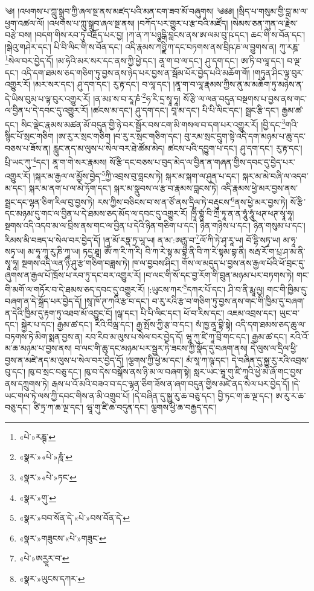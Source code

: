 ༄། །འཕགས་པ་ཀླུ་སྒྲུབ་ཀྱི་ཞལ་སྔ་ནས་མཛད་པའི་མན་ངག་ཟབ་མོ་བཞུགས། ༄༅༅། །སྲིད་པ་གསུམ་གྱི་བླ་མ་ལ་ཕྱག་འཚལ་ལོ། །འཕགས་པ་ཀླུ་སྒྲུབ་ཞལ་སྔ་ནས། །བཀོད་པར་གྱུར་པ་རྩ་བའི་མཛོད། །སེམས་ཅན་ཀུན་ལ་རྗེས་བརྩེ་བས། །བདག་གིས་རབ་ཏུ་བརྗོད་པར་བྱ། །ཀ་ན་ཀ་པཉྩདྒི་བླངས་ནས་ཨ་ལམ་བུ་ཥ་དང་། ཆང་གི་ས་བོན་དང་། །སྒེའུ་གཤེར་དང་། པི་བི་ལིང་གི་ས་བོན་དང་། འདི་རྣམས་ཀཉྫི་ཀ་དང་བཏགས་ནས་བྲིཥ་ཎ་ལ་བྱུགས་ན། ཀུ་རཎྜ་\footnote{«པེ་»རཎྚ་}སེལ་བར་བྱེད་དོ། །མ་ཧེའི་མར་སར་དང་ནས་ཀྱི་ཕྱེ་དང་། ནཱ་ག་བ་ལ་དང་། ཤུ་དག་དང་། ཨ་ཏི་བ་ལཱ་དང་། བ་ལྔ་དང་། འདི་དག་ཐམས་ཅད་གཅིག་ཏུ་བྱས་ནས་ཉེད་པར་བྱས་ན་སྦོམ་པོར་བྱེད་པའི་མཆོག་གོ། །གཏུན་ཤིང་ལྟ་བུར་འགྱུར་རོ། །མར་སར་དང་། ཤུ་དག་དང་། རུ་རྟ་དང་། བ་ལཱ་དང་། །ནཱ་ག་བ་ལཱ་རྣམས་ཀྱིས་ནུ་མ་མཆོག་ཏུ་མཉེས་ན་དེ་ཡིས་བུམ་པ་ལྟ་བུར་འགྱུར་རོ། །ན་མཿ་ས་བ་རཱ་ཎཾ་\footnote{«སྣར་»«པེ་»ཎཱཾ་}ཧ་རི་དྲ་སྭཱ་ཧཱ། སོ་རྩི་ལ་ལན་བདུན་བསྔགས་པ་བྱས་ནས་གང་ལ་བྱིན་པ་དེ་དབང་དུ་འགྱུར་རོ། །ཚངས་མ་དང་། ཤུ་དག་དང་། བཱ་མ་དང་། པི་པི་ལིང་དང་། སྦྲང་རྩི་དང་། རྒྱམ་ཚ་དང་། སིང་ལྡེང་རྣམས་མཚན་མོ་བདུན་གྱི་ཉེ་བར་སྦྱོར་བས་ངག་མི་གསལ་བ་དག་པར་འགྱུར་རོ། །བྱི་དང་\footnote{«སྣར་»«པེ་»ཏང་}གའི་སྙིང་པོ་སྲང་གཅིག །ཨ་རུ་ར་སྲང་གཅིག །བ་རུ་ར་སྲང་གཅིག་དང་། བུ་རམ་སྲང་དྲུག་སྟེ་འདི་དག་མཉམ་པ་ཆུ་དང་བཅས་པ་ཟོས་ན། རླུང་ནད་མ་ལུས་པ་སེལ་བར་ཐེ་ཚོམ་མེད། ཚངས་པའི་དབྱུག་པ་དང་། ཤུ་དག་དང་། རུ་རྟ་དང་། པྲི་ཡང་ཀུ་\footnote{«སྣར་»གུ་}དང་། ནཱ་ག་གེ་སར་རྣམས། སོ་རྩི་དང་བཅས་པ་བུད་མེད་ལ་བྱིན་ན་གཞན་གྱིས་དབང་དུ་བྱེད་པར་འགྱུར་རོ། །སྐར་མ་རྒྱལ་ལ་མྱོས་བྱེད་\footnote{«སྣར་»བབ་སོན་ེད་«པེ་»བས་བོན་ེད་}ཀྱི་འབྲས་བུ་བླངས་ཏེ། སྐར་མ་སྐག་ལ་ཤུན་པ་དང་། སྐར་མ་མེ་བཞི་ལ་འདབ་མ་དང་། སྐར་མ་ནག་པ་ལ་མེ་ཏོག་དང་། སྐར་མ་སྣུབས་ལ་རྩ་བ་རྣམས་བླངས་ཏེ། འདི་རྣམས་ཕྱེ་མར་བྱས་ནས་སྦྲང་དང་ལྷན་ཅིག་རིལ་བུ་བྱས་ཏེ། རས་ཀྱིས་བཅིངས་བ་ས་ན་ཙོ་ནས་དྲིལ་ཏེ་བརྡུངས་\footnote{«སྣར་»གཟུངས་«པེ་»གཟུང་}ནས་ཕྱེ་མར་བྱས་ཏེ། སོ་རྩི་དང་མཉམ་དུ་གང་ལ་བྱིན་པ་དེ་ཐམས་ཅད་མོད་ལ་དབང་དུ་འགྱུར་རོ། །ཧྲཱིཾ་གྷུཾ་བི་ཀྲྀ་ཏཱ་ན་ན་ཧཱུཾ་ཧཱུཾ་ཕཊ་ཕཊ་སྭཱ་ཧཱ། སྔགས་འདི་འདབ་མ་ལ་བྲིས་ནས་གང་ལ་བྱིན་པ་དེའི་ཉིན་གཅིག་པ་དང་། ཉིན་གཉིས་པ་དང་། ཉིན་གསུམ་པ་དང་། རིམས་མི་བཟད་པ་སེལ་བར་བྱེད་དོ། །ན་མོ་རཏྣ་ཏྲ་ཡཱ་ཡ། ན་མ་:ཨརྻཱ་བ་\footnote{«པེ་»ཨརྱཱར་བ་}ལོ་ཀི་ཏེ་ཤྭ་རཱ་ཡ། བོ་དྷི་སཏྭ་ཡ། མ་ཧཱ་སཏྭ་ཡ། མ་ཧཱ་ཀཱ་རུ་ཎི་ཀཱ་ཡ། ཏདྱ་ཐཱ། ཨོཾ་ཀ་རི་ཀ་རི། བི་ཀ་རེ་སྟ་མ་བྷ་ནི་བི་ཀ་རེ་སྟམ་བྷ་ནི། སརྦ་རོ་ག་པྲ་ཤ་མ་ནི་སྭཱ་ཧཱ། སྔགས་འདི་ལན་ཉི་ཤུ་རྩ་གཅིག་བཟླས་ཏེ། ཁ་ལ་བྱབས་ཤིང་། གོས་ལ་མདུད་པ་བྱས་ནས་རྒྱལ་པོའི་ཕོ་བྲང་དུ་ཞུགས་ན་རྒྱལ་པོ་ཁྲོས་པ་རབ་ཏུ་དང་བར་འགྱུར་རོ། །བ་ལང་གི་སོ་དང་བྱ་རོག་གི་བྲུན་མཉམ་པར་བཏགས་ཏེ། གང་གི་མགོ་ལ་གཏོར་བ་དེ་ཐམས་ཅད་དབང་དུ་འགྱུར་རོ། །:ཡུངས་ཀར་\footnote{«སྣར་»ཡུངས་དཀར་}དཀར་པོ་དང་། ཤི་བ་ནི་རྨཱ་ལྱ། གང་གི་ཁྱིམ་དུ་བཞག་ན་དེ་སྐྲོད་པར་བྱེད་དོ། །སཱ་ཁོ་ཊ་ཀའི་རྩ་བ་དང་། བ་རུ་རའི་རྩ་བ་གཅིག་ཏུ་བྱས་ནས་གང་གི་ཁྱིམ་དུ་བཞག་ན་དེའི་ཁྱིམ་དུ་རྟག་ཏུ་འཐབ་མོ་འབྱུང་ངོ། །ལྒ་དང་། པི་པི་ལིང་དང་། ཕོ་བ་རིས་དང་། འཇམ་འབྲས་དང་། ཡུང་བ་དང་། སྐྱེར་པ་དང་། རྒྱམ་ཚ་དང་། རིའི་བིལྦ་དང་། རྒྱ་སྤོས་ཀྱི་རྩ་བ་དང་། སཾ་ཁྱ་ནཱ་བྷི་སྟེ། འདི་དག་ཐམས་ཅད་ཆུ་ལ་བཏགས་ཏེ་མིག་སྨན་བྱས་ན། རབ་རིབ་མ་ལུས་པ་སེལ་བར་བྱེད་དོ། ཝཱ་ཀུ་ཛི་ཀཱ་བྲི་གང་དང་། རྒྱམ་ཚ་དང་། རའི་འོ་མ་ཆ་མཉམ་པ་བྱས་ནས། བ་ལང་གི་ཆུ་དང་མཉམ་པར་སྦྱར་ཏེ་ཟངས་ཀྱི་སྣོད་དུ་བཞག་ནས། དེ་ལུས་ལ་དྲིལ་ཕྱི་བྱས་ན་མཛེ་ནད་མ་ལུས་པ་སེལ་བར་བྱེད་དོ། །ལྕགས་ཀྱི་ཕྱེ་མ་དང་། མཾ་སཱ་ཀ་ཥྚ་དང་། དེ་བཞིན་དུ་སྐྱུ་རུ་རའི་འབྲས་བུ་དང་། ཁུ་བ་སྲང་བཅུ་དང་། ཁུ་བ་དེས་བསྒོས་ནས་ཉི་མ་ལ་བཞག་སྟེ། སླར་ཡང་ཝཱ་གུ་ཛི་ཀཱའི་ཕྱེ་མ་ཞོ་གང་བྱས་ནས་དཀྲུགས་ཏེ། རྒས་པ་འོ་མའི་བཟའ་བ་དང་ལྷན་ཅིག་ཟོས་ན་ཞག་བདུན་གྱིས་མཛེ་ནད་སེལ་པར་བྱེད་དོ། །དེ་ཡང་གལ་ཏེ་ལས་ཀྱི་དབང་གིས་ན་མི་འགྲུབ་པོ། །དེ་བཞིན་དུ་སྐྱུ་རུ་ཆ་བཅུ་དང་། བྱི་ཏང་ག་ཆ་ལྔ་དང་། ཨ་རུ་ར་ཆ་བཅུ་དང་། ཙི་ཏྲ་ཀ་ཆ་ལྔ་དང་། ཝཱ་གུ་ཛི་ཆ་བདུན་དང་། ལྕགས་ཕྱེ་ཆ་བརྒྱད་དང་། 